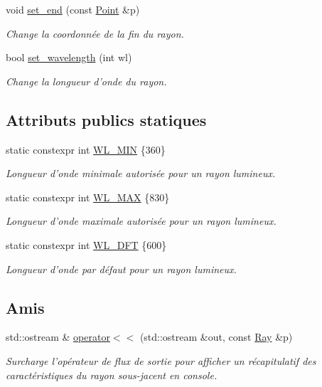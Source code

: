 \begin{DoxyCompactItemize}
void \hyperlink{classRay_a1e8a43e951a1b21cc6e8548590c6da2e}{set\+\_\+end} (const \hyperlink{classPoint}{Point} \&p)
\begin{DoxyCompactList}\small\item\em Change la coordonnée de la fin du rayon. \end{DoxyCompactList}\item 
bool \hyperlink{classRay_a1336c12ef2df730a27b8315c323d8414}{set\+\_\+wavelength} (int wl)
\begin{DoxyCompactList}\small\item\em Change la longueur d'onde du rayon. \end{DoxyCompactList}\end{DoxyCompactItemize}
\subsection*{Attributs publics statiques}
\begin{DoxyCompactItemize}
\item 
static constexpr int \hyperlink{classRay_afecf2fa5a603689c3e77cbefbe08ffb1}{W\+L\+\_\+\+M\+I\+N} \{360\}
\begin{DoxyCompactList}\small\item\em Longueur d'onde minimale autorisée pour un rayon lumineux. \end{DoxyCompactList}\item 
static constexpr int \hyperlink{classRay_a95eddd74f049d2511ffa09242b937b2c}{W\+L\+\_\+\+M\+A\+X} \{830\}
\begin{DoxyCompactList}\small\item\em Longueur d'onde maximale autorisée pour un rayon lumineux. \end{DoxyCompactList}\item 
static constexpr int \hyperlink{classRay_aa08b1d2a9423fab3502c460d787b7551}{W\+L\+\_\+\+D\+F\+T} \{600\}
\begin{DoxyCompactList}\small\item\em Longueur d'onde par défaut pour un rayon lumineux. \end{DoxyCompactList}\end{DoxyCompactItemize}
\subsection*{Amis}
\begin{DoxyCompactItemize}
\item 
std\+::ostream \& \hyperlink{classRay_a922c5f63f21a8ebd85b8544a8e1d3933}{operator$<$$<$} (std\+::ostream \&out, const \hyperlink{classRay}{Ray} \&p)
\begin{DoxyCompactList}\small\item\em Surcharge l'opérateur de flux de sortie pour afficher un récapitulatif des caractéristiques du rayon sous-\/jacent en console. \end{DoxyCompactList}\end{DoxyCompactItemize}


